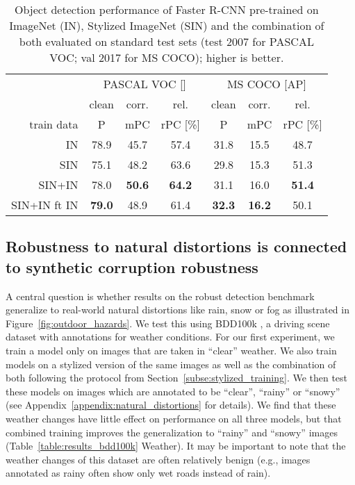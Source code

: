 \documentclass{article}
\newcommand{\highlight}[1]{{\cellcolor{gray.220} #1}}
\begin{document}
\begin{table}[t]\footnotesize
\begin{center}
\begin{tabular}{r|ccc|ccc}
\toprule
 &\multicolumn{3}{c|}{PASCAL VOC []} & \multicolumn{3}{c}{MS COCO [AP]}\\
& clean & \highlight{corr.} & rel. & clean & \highlight{corr.} & rel. \\
train data & P & \highlight{mPC} & rPC [\%] & P & \highlight{mPC} & rPC [\%] \\
\hline
IN & 78.9 & \highlight{45.7} & 57.4 & 31.8 & \highlight{15.5} & 48.7 \\
\hline
SIN & 75.1 & \highlight{48.2} & 63.6 & 29.8 & \highlight{15.3} & 51.3\\
SIN+IN & 78.0 & \highlight{\textbf{50.6}} & \textbf{64.2} & 31.1 & \highlight{16.0} & \textbf{51.4} \\
SIN+IN ft IN & \textbf{79.0} & \highlight{48.9} & 61.4 & \textbf{32.3} & \highlight{\textbf{16.2}} & 50.1 \\
\bottomrule
\end{tabular}
\caption{Object detection performance of Faster R-CNN pre-trained on ImageNet (IN), Stylized ImageNet (SIN) and the combination of both evaluated on standard test sets (test 2007 for PASCAL VOC; val 2017 for MS COCO); higher is better.}
\label{table:results_stylized_pretraining}
\vspace{-0.3cm}
\end{center}
\end{table}



\subsection{Robustness to natural distortions is connected to synthetic corruption robustness}

A central question is whether results on the robust detection benchmark generalize to real-world natural distortions like rain, snow or fog as illustrated in Figure~\ref{fig:outdoor_hazards}. We test this using BDD100k \citep{yu2018bdd100k}, a driving scene dataset with annotations for weather conditions. For our first experiment, we train a model only on images that are taken in ``clear'' weather. We also train models on a stylized version of the same images as well as the combination of both following the protocol from Section~\ref{subse:stylized_training}. We then test these models on images which are annotated to be ``clear'', ``rainy'' or ``snowy'' (see Appendix~\ref{appendix:natural_distortions} for details). We find that these weather changes have little effect on performance on all three models, but that combined training improves the generalization to ``rainy'' and ``snowy'' images (Table~\ref{table:results_bdd100k} Weather). It may be important to note that the weather changes of this dataset are often relatively benign (e.g., images annotated as rainy often show only wet roads instead of rain). 
\end{document}
